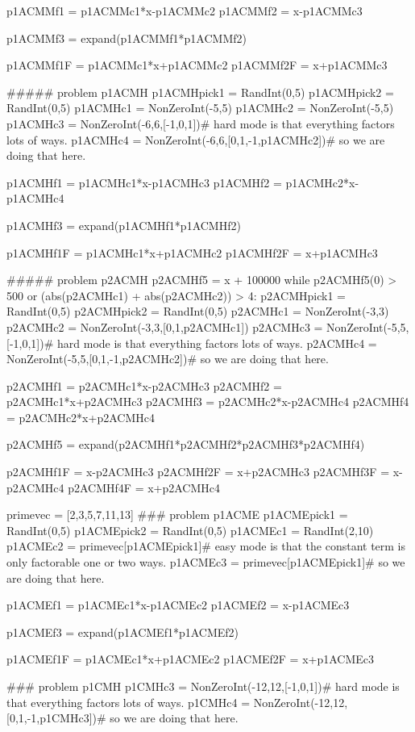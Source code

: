 \documentclass{ximera}
\begin{document}
\begin{sagesilent}
p1ACMMf1 = p1ACMMc1*x-p1ACMMc2
p1ACMMf2 = x-p1ACMMc3

p1ACMMf3 = expand(p1ACMMf1*p1ACMMf2)

p1ACMMf1F = p1ACMMc1*x+p1ACMMc2
p1ACMMf2F = x+p1ACMMc3


##### problem p1ACMH
p1ACMHpick1 = RandInt(0,5)
p1ACMHpick2 = RandInt(0,5)
p1ACMHc1 = NonZeroInt(-5,5)
p1ACMHc2 = NonZeroInt(-5,5)
p1ACMHc3 = NonZeroInt(-6,6,[-1,0,1])# hard mode is that everything factors lots of ways.
p1ACMHc4 = NonZeroInt(-6,6,[0,1,-1,p1ACMHc2])# so we are doing that here.

p1ACMHf1 = p1ACMHc1*x-p1ACMHc3
p1ACMHf2 = p1ACMHc2*x-p1ACMHc4

p1ACMHf3 = expand(p1ACMHf1*p1ACMHf2)

p1ACMHf1F = p1ACMHc1*x+p1ACMHc2
p1ACMHf2F = x+p1ACMHc3


##### problem p2ACMH
p2ACMHf5 = x + 100000
while p2ACMHf5(0) > 500 or (abs(p2ACMHc1) + abs(p2ACMHc2)) > 4:
    p2ACMHpick1 = RandInt(0,5)
    p2ACMHpick2 = RandInt(0,5)
    p2ACMHc1 = NonZeroInt(-3,3)
    p2ACMHc2 = NonZeroInt(-3,3,[0,1,p2ACMHc1])
    p2ACMHc3 = NonZeroInt(-5,5,[-1,0,1])# hard mode is that everything factors lots of ways.
    p2ACMHc4 = NonZeroInt(-5,5,[0,1,-1,p2ACMHc2])# so we are doing that here.
    
    p2ACMHf1 = p2ACMHc1*x-p2ACMHc3
    p2ACMHf2 = p2ACMHc1*x+p2ACMHc3
    p2ACMHf3 = p2ACMHc2*x-p2ACMHc4
    p2ACMHf4 = p2ACMHc2*x+p2ACMHc4
    
    p2ACMHf5 = expand(p2ACMHf1*p2ACMHf2*p2ACMHf3*p2ACMHf4)
    
    p2ACMHf1F = x-p2ACMHc3
    p2ACMHf2F = x+p2ACMHc3
    p2ACMHf3F = x-p2ACMHc4
    p2ACMHf4F = x+p2ACMHc4


primevec = [2,3,5,7,11,13]
### problem p1ACME
p1ACMEpick1 = RandInt(0,5)
p1ACMEpick2 = RandInt(0,5)
p1ACMEc1 = RandInt(2,10)
p1ACMEc2 = primevec[p1ACMEpick1]# easy mode is that the constant term is only factorable one or two ways.
p1ACMEc3 = primevec[p1ACMEpick1]# so we are doing that here.

p1ACMEf1 = p1ACMEc1*x-p1ACMEc2
p1ACMEf2 = x-p1ACMEc3

p1ACMEf3 = expand(p1ACMEf1*p1ACMEf2)

p1ACMEf1F = p1ACMEc1*x+p1ACMEc2
p1ACMEf2F = x+p1ACMEc3

### problem p1CMH
p1CMHc3 = NonZeroInt(-12,12,[-1,0,1])# hard mode is that everything factors lots of ways.
p1CMHc4 = NonZeroInt(-12,12,[0,1,-1,p1CMHc3])# so we are doing that here.


\end{sagesilent}
\end{document}
